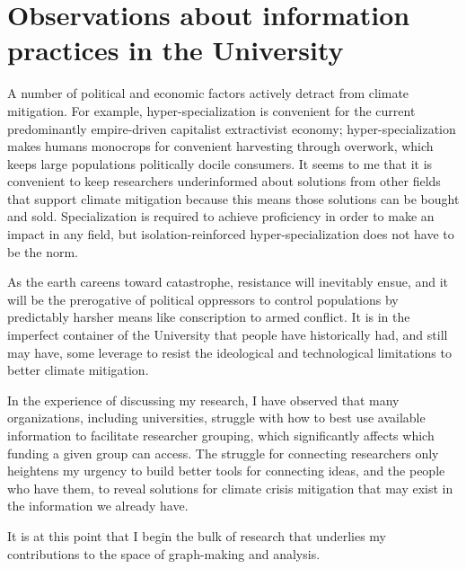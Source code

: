 \section{Observations about information practices in the University}
A number of political and economic factors actively detract from climate mitigation. For example, hyper-specialization is convenient for the current predominantly empire-driven capitalist extractivist economy; hyper-specialization makes humans monocrops for convenient harvesting through overwork, which keeps large populations politically docile consumers. It seems to me that it is convenient to keep researchers underinformed about solutions from other fields that support climate mitigation because this means those solutions can be bought and sold. Specialization is required to achieve proficiency in order to make an impact in any field, but isolation-reinforced hyper-specialization does not have to be the norm.

As the earth careens toward catastrophe, resistance will inevitably ensue, and it will be the prerogative of political oppressors to control populations by predictably harsher means like conscription to armed conflict. It is in the imperfect container of the University that people have historically had, and still may have, some leverage to resist the ideological and technological limitations to better climate mitigation. 

In the experience of discussing my research, I have observed that many organizations, including universities, struggle with how to best use available information to facilitate researcher grouping, which significantly affects which funding a given group can access. The struggle for connecting researchers only heightens my urgency to build better tools for connecting ideas, and the people who have them, to reveal solutions for climate crisis mitigation that may exist in the information we already have. 

It is at this point that I begin the bulk of research that underlies my contributions to the space of graph-making and analysis.
